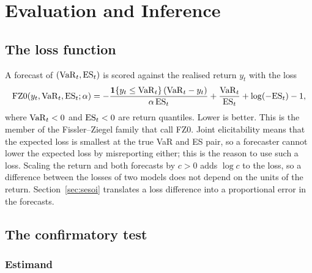 \section{Evaluation and Inference}\label{ch:eval}

\subsection{The loss function}\label{sec:loss}

A forecast of $(\mathrm{VaR}_t,\mathrm{ES}_t)$ is scored against the realised return $y_t$ with the loss
\begin{equation}
\mathrm{FZ0}(y_t,\mathrm{VaR}_t,\mathrm{ES}_t;\alpha)=-\frac{\mathbf{1}\{y_t\le \mathrm{VaR}_t\}\,(\mathrm{VaR}_t-y_t)}{\alpha\,\mathrm{ES}_t}+\frac{\mathrm{VaR}_t}{\mathrm{ES}_t}+\log(-\mathrm{ES}_t)-1,
\end{equation}
where $\mathrm{VaR}_t<0$ and $\mathrm{ES}_t<0$ are return quantiles. Lower is better. This is the member of the Fissler--Ziegel family \citep{fissler2016} that \citet{patton2019} call FZ0. Joint elicitability means that the expected loss is smallest at the true VaR and ES pair, so a forecaster cannot lower the expected loss by misreporting either; this is the reason to use such a loss. Scaling the return and both forecasts by $c>0$ adds $\log c$ to the loss, so a difference between the losses of two models does not depend on the units of the return. Section~\ref{sec:sesoi} translates a loss difference into a proportional error in the forecasts.

\subsection{The confirmatory test}

\subsubsection{Estimand}\label{sec:estimand}

